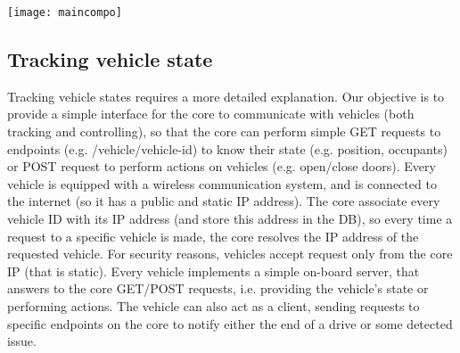 \texttt{[image: maincompo]}

\subsection{Tracking vehicle state}
Tracking vehicle states requires a more detailed explanation. Our objective is to provide a simple interface for the core to communicate with vehicles (both tracking and controlling), so that the core can perform simple GET requests to endpoints (e.g. /vehicle/vehicle-id) to know their state (e.g. position, occupants) or POST request to perform actions on vehicles (e.g. open/close doors). Every vehicle is equipped with a wireless communication system, and is connected to the internet (so it has a public and static IP address). The core associate every vehicle ID with its IP address (and store this address in the DB), so every time a request to a specific vehicle is made, the core resolves the IP address of the requested vehicle. For security reasons, vehicles accept request only from the core IP (that is static). Every vehicle implements a simple on-board server, that answers to the core GET/POST requests, i.e. providing the vehicle's state or performing actions.
The vehicle can also act as a client, sending requests to specific endpoints on the core to notify either the end of a drive or some detected issue. 

